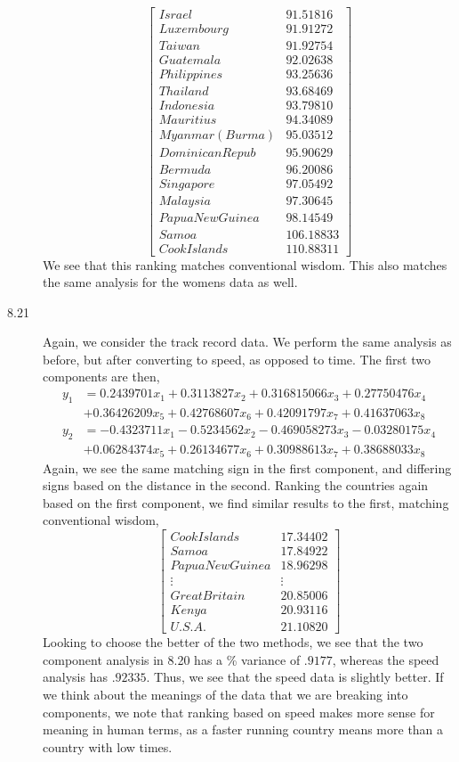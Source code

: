 \documentclass[letterpaper,10pt]{article}
\begin{document}
\begin{description}
\[\begin{bmatrix}
Israel  &  91.51816\\
Luxembourg  &  91.91272\\
Taiwan  &  91.92754\\
Guatemala  &  92.02638\\
Philippines  &  93.25636\\
Thailand  &  93.68469\\
Indonesia  &  93.79810\\
Mauritius  &  94.34089\\
Myanmar(Burma)  &  95.03512\\
DominicanRepub  &  95.90629\\
Bermuda  &  96.20086\\
Singapore  &  97.05492\\
Malaysia  &  97.30645\\
PapuaNewGuinea  &  98.14549\\
Samoa &  106.18833\\
CookIslands  & 110.88311
\end{bmatrix}\]
We see that this ranking matches conventional wisdom. This also matches the same analysis for the womens data as well.
\item[8.21] Again, we consider the track record data. We perform the same analysis as before, but after converting to speed, as opposed to time. The first two components are then,
\begin{align*}
y_{1} &= 0.2439701x_1 +0.3113827x_2 +0.316815066x_3 +0.27750476x_4\\ 
&+0.36426209x_5+0.42768607x_6+0.42091797x_7 +0.41637063x_8\\
y_{2} &= -0.4323711x_1 -0.5234562x_2 -0.469058273x_3 -0.03280175x_4 \\
& +0.06284374x_5+0.26134677x_6 + 0.30988613x_7+  0.38688033x_8
\end{align*}
Again, we see the same matching sign in the first component, and differing signs based on the distance in the second. Ranking the countries again based on the first component, we find similar results to the first, matching conventional wisdom,
\[\begin{bmatrix}
CookIslands & 17.34402\\
Samoa & 17.84922\\
PapuaNewGuinea & 18.96298\\
\vdots & \vdots\\
GreatBritain & 20.85006\\
Kenya & 20.93116\\
U.S.A. & 21.10820
\end{bmatrix}\]
Looking to choose the better of the two methods, we see that the two component analysis in 8.20 has a \% variance of $.9177$, whereas the speed analysis has $.92335$. Thus, we see that the speed data is slightly better. If we think about the meanings of the data that we are breaking into components, we note that ranking based on speed makes more sense for meaning in human terms, as a faster running country means more than a country with low times. 
\end{description}
\end{document}
